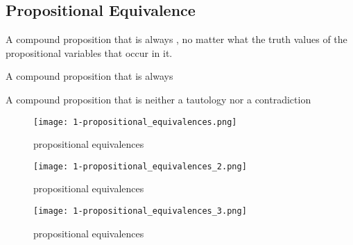 \documentclass[../main.tex]{subfile}
\begin{document}
\subsection{Propositional Equivalence}
\begin{definition}[tautology] A compound proposition that is always , no matter what the truth values of the propositional variables that occur in it.
\end{definition}
	\begin{definition}[contradiction] A compound proposition that is always 
	\end{definition}
	\begin{definition}[contingency]A compound proposition that is neither a tautology nor a contradiction
	
\end{definition}	
\begin{figure}[h!]
\centering
\texttt{[image: 1-propositional\_equivalences.png]}
\caption{propositional equivalences}
\end{figure}
\begin{figure}[h!]
\centering
\texttt{[image: 1-propositional\_equivalences\_2.png]}
\caption{propositional equivalences}
\end{figure}
\begin{figure}[h!]
\centering
\texttt{[image: 1-propositional\_equivalences\_3.png]}
\caption{propositional equivalences}
\end{figure}
\clearpage
\end{document}

